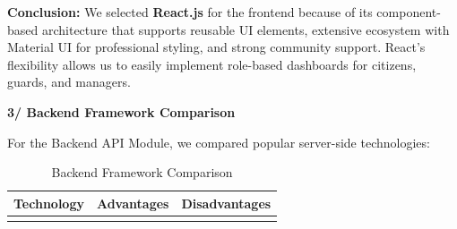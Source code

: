 \documentclass[a4paper]{article}
\begin{document}
\noindent \textbf{Conclusion:} We selected \textbf{React.js} for the frontend because of its component-based architecture that supports reusable UI elements, extensive ecosystem with Material UI for professional styling, and strong community support. React's flexibility allows us to easily implement role-based dashboards for citizens, guards, and managers.

\vspace{0.5cm}
\noindent \textbf{3/ Backend Framework Comparison}

For the Backend API Module, we compared popular server-side technologies:

\begin{longtable}{@{}
    >{\raggedright\arraybackslash}p{}
    >{\raggedright\arraybackslash}p{}
    >{\raggedright\arraybackslash}p{} @{}}

    \caption{Backend Framework Comparison}
    \label{tab:backend_comparison} \\

    \toprule
    \textbf{Technology} & \textbf{Advantages} & \textbf{Disadvantages} \\
    \midrule
    \endfirsthead

    \bottomrule
    \endlastfoot


\end{longtable}
\end{document}
